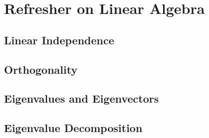 \section{Refresher on Linear Algebra}


\subsection{Linear Independence}



\subsection{Orthogonality}


\subsection{Eigenvalues and Eigenvectors}



\subsection{Eigenvalue Decomposition}

